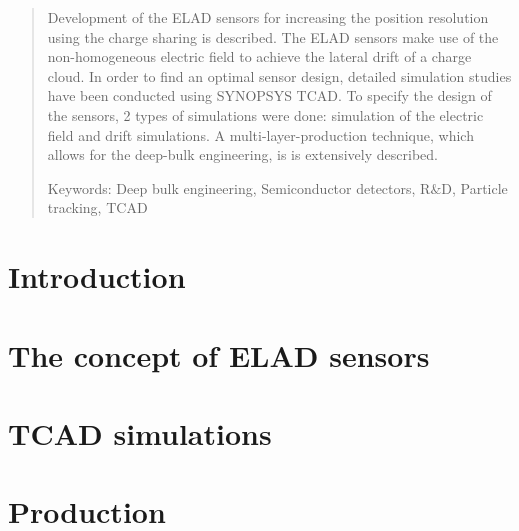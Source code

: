 \documentclass[a4paper,10pt]{article}
\newcommand*{\notFOREPJ}{}%
\begin{document}
\begin{abstract}
\noindent

Development of the ELAD sensors for increasing the position resolution using the charge sharing is described. 
The ELAD sensors make use of the non-homogeneous electric field to achieve the lateral drift of a charge cloud. 
In order to find an optimal sensor design, detailed simulation studies have been conducted using SYNOPSYS TCAD.
To specify the design of the sensors,  2 types of simulations were done: simulation of the electric field and drift simulations. 
A multi-layer-production technique, which allows for the deep-bulk engineering, is is extensively described.  

\noindent
Keywords: Deep bulk engineering, Semiconductor detectors, R$\&$D, Particle tracking, TCAD %

\end{abstract}


\section{Introduction}
\label{sec:intro}
\ifdefined\notFOREPJ

\else
 
\fi
% 
%  
%  

\section{The concept of ELAD sensors}
\label{sec:concept}
\ifdefined\notFOREPJ

\else
 
\fi

\section{TCAD simulations}
\label{sec:simulations}
\ifdefined\notFOREPJ
 
\else
 
\fi


\section{Production}
\label{sec:production}
\ifdefined\notFOREPJ
 
\else
 
\fi
\end{document}
